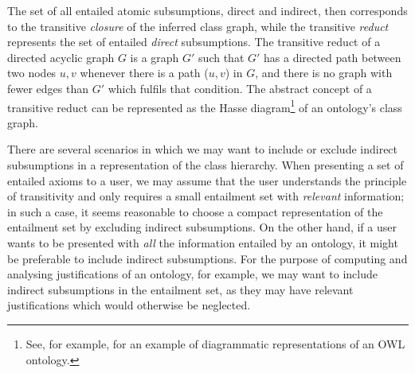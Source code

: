 The set of all entailed atomic subsumptions, direct and indirect, then corresponds to the transitive \emph{closure} of the inferred class graph, while the transitive \emph{reduct} \cite{aho72pz} represents the set of entailed \emph{direct} subsumptions. The transitive reduct of a directed acyclic graph $G$ is a graph $G'$ such that $G'$ has a directed path between two nodes $u,v$ whenever there is a path ($u, v$) in $G$, and there is no graph with fewer edges than $G'$ which fulfils that condition. The abstract concept of a transitive reduct can be represented as the Hasse diagram\footnote{See, for example, \cite{joslyn06aa} for an example of diagrammatic representations of an OWL ontology.} of an ontology's class graph.

There are several scenarios in which we may want to include or exclude indirect subsumptions in a representation of the class hierarchy. When presenting a set of entailed axioms to a user, we may  assume that the user understands the principle of transitivity and only requires a small entailment set with \emph{relevant} information; in such a case, it seems reasonable to choose a compact representation of the entailment set by excluding indirect subsumptions. On the other hand, if a user wants to be presented with \emph{all} the information entailed by an ontology, it might be preferable to include indirect subsumptions. For the purpose of computing and analysing justifications of an ontology, for example, we may want to include indirect subsumptions in the entailment set, as they may have relevant justifications which would otherwise be neglected.

